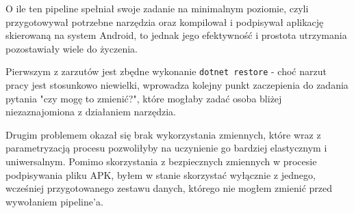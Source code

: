 O ile ten pipeline spełniał swoje zadanie na minimalnym poziomie, czyli przygotowywał potrzebne narzędzia 
oraz kompilował i podpisywał aplikację skierowaną na system Android, to jednak jego efektywność i prostota 
utrzymania pozostawiały wiele do życzenia.

Pierwszym z zarzutów jest zbędne wykonanie \verb|dotnet restore| - choć narzut pracy 
jest stosunkowo niewielki, wprowadza kolejny punkt zaczepienia do zadania pytania "czy mogę to zmienić?", 
które mogłaby zadać osoba bliżej niezaznajomiona z działaniem narzędzia.

Drugim problemem okazał się brak wykorzystania zmiennych, które wraz z parametryzacją procesu 
pozwoliłyby na uczynienie go bardziej elastycznym i uniwersalnym. 
Pomimo skorzystania z bezpiecznych zmiennych w procesie podpisywania pliku APK, 
byłem w stanie skorzystać wyłącznie z jednego, wcześniej przygotowanego zestawu danych, 
którego nie mogłem zmienić przed wywołaniem pipeline'a.

